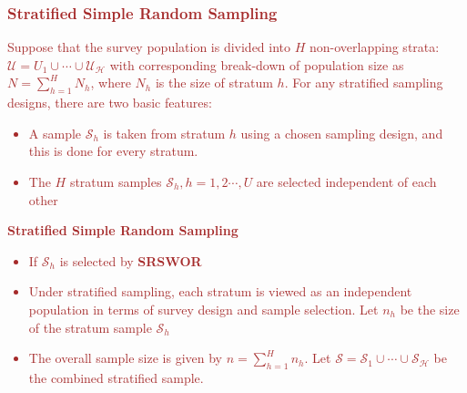 \documentclass[a4paper,twoside,11pt]{article}
\begin{document}
\textcolor{Brown}{
\subsubsection{Stratified Simple Random Sampling}
Suppose that the survey population is divided into $H$ non-overlapping strata: $\mathcal{U}= U_1 \cup \cdots \cup \mathcal{U_H}$ with corresponding break-down of population size as $N = \sum^H_{h=1} N_h$, where $N_h$ is the size of stratum $h$. For any stratified sampling designs, there are two basic features:
\begin{itemize}
    \item A sample $\mathcal{S}_h$ is taken from stratum $h$ using a chosen sampling design, and this is done for every stratum.
    \item The $H$ stratum samples $\mathcal{S}_h,h=1,2\cdots, U$ are selected independent of each other
\end{itemize}
\textbf{Stratified Simple Random Sampling}
\begin{itemize}
    \item If $\mathcal{S}_h$ is selected by \textbf{SRSWOR}
    \item Under stratified sampling, each stratum is viewed as an independent population in terms of survey design and sample selection. Let $n_h$ be the size of the stratum sample $\mathcal{S}_h$
    \item The overall sample size is given by $n = \sum^H_{h=1} n_h$. Let $\mathcal{S = S}_1 \cup \cdots \cup \mathcal{S_H}$ be the combined stratified sample. 
\end{itemize}
}
\end{document}

